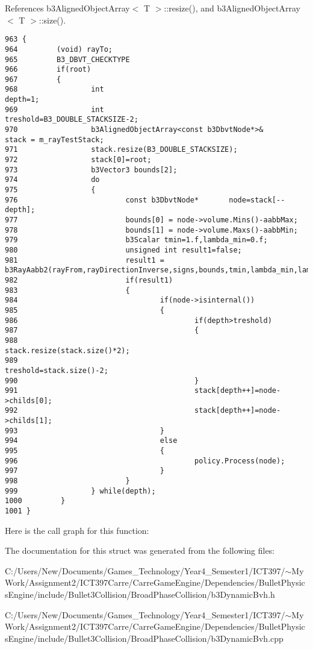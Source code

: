 References b3AlignedObjectArray$<$ T $>$::resize(), and b3AlignedObjectArray$<$ T $>$::size().

\begin{Code}\begin{verbatim}963 {
964         (void) rayTo;
965         B3_DBVT_CHECKTYPE
966         if(root)
967         {
968                 int                                                             depth=1;
969                 int                                                             treshold=B3_DOUBLE_STACKSIZE-2;
970                 b3AlignedObjectArray<const b3DbvtNode*>&        stack = m_rayTestStack;
971                 stack.resize(B3_DOUBLE_STACKSIZE);
972                 stack[0]=root;
973                 b3Vector3 bounds[2];
974                 do      
975                 {
976                         const b3DbvtNode*       node=stack[--depth];
977                         bounds[0] = node->volume.Mins()-aabbMax;
978                         bounds[1] = node->volume.Maxs()-aabbMin;
979                         b3Scalar tmin=1.f,lambda_min=0.f;
980                         unsigned int result1=false;
981                         result1 = b3RayAabb2(rayFrom,rayDirectionInverse,signs,bounds,tmin,lambda_min,lambda_max);
982                         if(result1)
983                         {
984                                 if(node->isinternal())
985                                 {
986                                         if(depth>treshold)
987                                         {
988                                                 stack.resize(stack.size()*2);
989                                                 treshold=stack.size()-2;
990                                         }
991                                         stack[depth++]=node->childs[0];
992                                         stack[depth++]=node->childs[1];
993                                 }
994                                 else
995                                 {
996                                         policy.Process(node);
997                                 }
998                         }
999                 } while(depth);
1000         }
1001 }
\end{verbatim}
\end{Code}




Here is the call graph for this function:

The documentation for this struct was generated from the following files:\begin{CompactItemize}
\item 
C:/Users/New/Documents/Games\_\-Technology/Year4\_\-Semester1/ICT397/$\sim$My Work/Assignment2/ICT397Carre/CarreGameEngine/Dependencies/BulletPhysicsEngine/include/Bullet3Collision/BroadPhaseCollision/b3DynamicBvh.h\item 
C:/Users/New/Documents/Games\_\-Technology/Year4\_\-Semester1/ICT397/$\sim$My Work/Assignment2/ICT397Carre/CarreGameEngine/Dependencies/BulletPhysicsEngine/include/Bullet3Collision/BroadPhaseCollision/b3DynamicBvh.cpp\end{CompactItemize}
